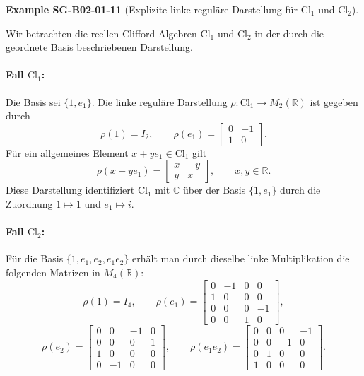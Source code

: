 \documentclass[10pt, letterpaper]{article}
\newcommand{\CustomHeading}[3]{%
  \par\medskip\noindent%
  \textbf{#1 #2} \textnormal{(#3)}.\enskip%
}
\newenvironment{EXA}[2]{\begin{unitbox}\CustomHeading{Example}{#1}{#2}}{\end{unitbox}}
\begin{document}
\begin{EXA}{SG-B02-01-11}{Explizite linke reguläre Darstellung für $\mathrm{Cl}_1$ und $\mathrm{Cl}_2$}
Wir betrachten die reellen Clifford-Algebren $\mathrm{Cl}_1$ und $\mathrm{Cl}_2$ in der durch die geordnete Basis beschriebenen Darstellung.

\paragraph{Fall $\mathrm{Cl}_1$:}
Die Basis sei $\{1, e_1\}$.  
Die linke reguläre Darstellung $\rho : \mathrm{Cl}_1 \to M_2(\mathbb{R})$ ist gegeben durch
\[
\rho(1) = I_2, 
\qquad 
\rho(e_1) = 
\begin{bmatrix}
0 & -1 \\[2pt]
1 & 0
\end{bmatrix}.
\]
Für ein allgemeines Element $x + y e_1 \in \mathrm{Cl}_1$ gilt
\[
\rho(x + y e_1) = 
\begin{bmatrix}
x & -y \\[2pt]
y & x
\end{bmatrix},
\qquad x,y \in \mathbb{R}.
\]
Diese Darstellung identifiziert $\mathrm{Cl}_1$ mit $\mathbb{C}$ über der Basis $\{1, e_1\}$ durch die Zuordnung
$1 \mapsto 1$ und $e_1 \mapsto i$.

\paragraph{Fall $\mathrm{Cl}_2$:}
Für die Basis $\{1, e_1, e_2, e_1 e_2\}$ erhält man durch dieselbe linke Multiplikation die folgenden Matrizen in $M_4(\mathbb{R})$:
\[
\rho(1) = I_4, \qquad
\rho(e_1) =
\begin{bmatrix}
0 & -1 & 0 & 0 \\
1 & 0 & 0 & 0 \\
0 & 0 & 0 & -1 \\
0 & 0 & 1 & 0
\end{bmatrix},
\]
\[
\rho(e_2) =
\begin{bmatrix}
0 & 0 & -1 & 0 \\
0 & 0 & 0 & 1 \\
1 & 0 & 0 & 0 \\
0 & -1 & 0 & 0
\end{bmatrix},
\qquad
\rho(e_1 e_2) =
\begin{bmatrix}
0 & 0 & 0 & -1 \\
0 & 0 & -1 & 0 \\
0 & 1 & 0 & 0 \\
1 & 0 & 0 & 0
\end{bmatrix}.
\]


\end{EXA}
\end{document}
